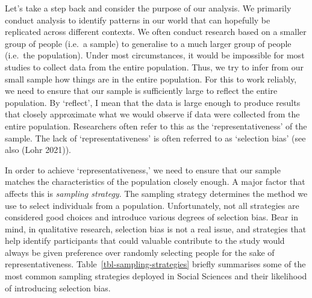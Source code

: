 \documentclass[
  letterpaper,
]{krantz}
\begin{document}
Let's take a step back and consider the purpose of our analysis. We
primarily conduct analysis to identify patterns in our world that can
hopefully be replicated across different contexts. We often conduct
research based on a smaller group of people (i.e.~a sample) to
generalise to a much larger group of people (i.e.~the population). Under
most circumstances, it would be impossible for most studies to collect
data from the entire population. Thus, we try to infer from our small
sample how things are in the entire population. For this to work
reliably, we need to ensure that our sample is sufficiently large to
reflect the entire population. By `reflect', I mean that the data is
large enough to produce results that closely approximate what we would
observe if data were collected from the entire population. Researchers
often refer to this as the `representativeness' of the sample. The lack
of `representativeness' is often referred to as `selection bias' (see
also (Lohr 2021)).

In order to achieve `representativeness,' we need to ensure that our
sample matches the characteristics of the population closely enough. A
major factor that affects this is \emph{sampling strategy}. The sampling
strategy determines the method we use to select individuals from a
population. Unfortunately, not all strategies are considered good
choices and introduce various degrees of selection bias. Bear in mind,
in qualitative research, selection bias is not a real issue, and
strategies that help identify participants that could valuable
contribute to the study would always be given preference over randomly
selecting people for the sake of representativeness.
Table~\ref{tbl-sampling-strategies} briefly summarises some of the most
common sampling strategies deployed in Social Sciences and their
likelihood of introducing selection bias.

\begingroup
\fontsize{9.0pt}{10.8pt}\selectfont
\end{document}
